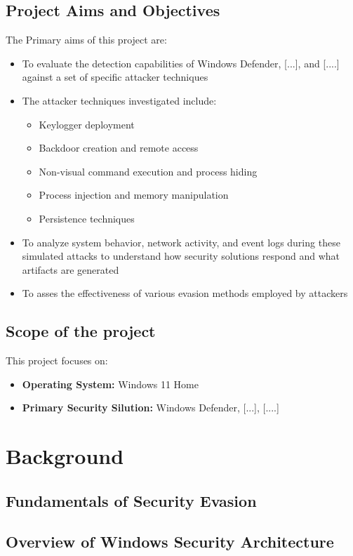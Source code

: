 \documentclass[11pt]{article}
\begin{document}
		\subsection{Project Aims and Objectives}
		The Primary aims of this project are:
		\begin{itemize}
			\item To evaluate the detection capabilities of Windows Defender, [...], and [....] against a set of specific attacker techniques
			\item The attacker techniques investigated include:
				\begin{itemize}
					\item Keylogger deployment
					\item Backdoor creation and remote access
					\item Non-visual command execution and process hiding
					\item Process injection and memory manipulation
					\item Persistence techniques
				\end{itemize}
			\item To analyze system behavior, network activity, and event logs during these simulated attacks to understand how security solutions respond and what artifacts are generated
			\item To asses the effectiveness of various evasion methods employed by attackers
		\end{itemize}
		\subsection{Scope of the project}
		This project focuses on:
		\begin{itemize}
			\item \textbf{Operating System:} Windows 11 Home
			\item \textbf{Primary Security Silution:} Windows Defender, [...], [....]
		\end{itemize}
		
		
		
		
		
		\section{Background}
			\subsection{Fundamentals of Security Evasion}
			\subsection{Overview of Windows Security Architecture}
\end{document}
